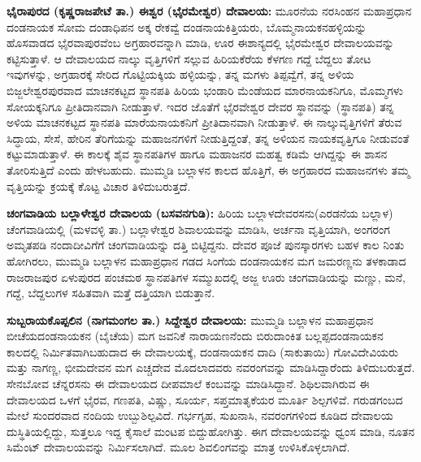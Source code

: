 \textbf{ಭೈರಾಪುರದ (ಕೃಷ್ಣರಾಜಪೇಟೆ ತಾ.) ಈಶ್ವರ (ಭೈರಮೇಶ್ವರ) ದೇವಾಲಯ:} ಮೂರನೆಯ ನರಸಿಂಹನ ಮಹಾಪ್ರಧಾನ ದಂಡನಾಯಕ ಸೋಮ ದಂಡಾಧಿಪನ ಅಕ್ಕ ರೇಕವ್ವೆ ದಂಡನಾಯಕಿತ್ತಿಯರು, ಬೊಮ್ಮನಾಯಕನಹಳ್ಳಿಯನ್ನು ಹೊಸವಾಡದ ಭೈರವಾಪುರವೆಂಬ ಅಗ್ರಹಾರವನ್ನಾಗಿ ಮಾಡಿ, ಊರ ಈಶಾನ್ಯದಲ್ಲಿ ಭೈರಮೇಶ್ವರ ದೇವಾಲಯವನ್ನು ಕಟ್ಟಿಸುತ್ತಾಳೆ. ಆ ದೇವಾಲಯದ ನಾಲ್ಕು ವೃತ್ತಿಗಳಿಗೆ ಸಲ್ಲುವ ಹಿರಿಯಕೆರೆಯ ಕೆಳಗಣ ಗದ್ದೆ ಬೆದ್ದಲು ತೋಟ ಇವುಗಳನ್ನು, ಅಗ್ರಹಾರಕ್ಕೆ ಸೇರಿದ ಗೊಟ್ಟಿಯಕ್ಕಿಯ ಹಳ್ಳಿಯನ್ನು, ತನ್ನ ಮಗಳು ತಿಪ್ಪವ್ವೆಗೆ, ತನ್ನ ಅಳಿಯ ಬಿಜ್ಜಲೇಶ್ವರಪುರವಾದ ಮಾಚನಕಟ್ಟದ ಸ್ಥಾನಪತಿ ಹಿರಿಯ ಭಂಡಾರಿ ಮೆಂಡೆಯದ ಮಾರನಾಯಕನಿಗೂ, ಮೊಮ್ಮಗಳು ಸೋಯಕ್ಕನಿಗೂ ಪ್ರೀತಿದಾನವಾಗಿ ನೀಡುತ್ತಾಳೆ. ಇದರ ಜೊತೆಗೆ ಭೈರವೇಶ್ವರ ದೇವರ ಸ್ಥಾನವನ್ನು (ಸ್ಥಾನಪತಿ) ತನ್ನ ಅಳಿಯ ಮಾಚನಕಟ್ಟದ ಸ್ಥಾನಪತಿ ಮಾರೆಯನಾಯಕನಿಗೆ ಪ್ರೀತಿದಾನವಾಗಿ ನೀಡುತ್ತಾಳೆ. ಈ ನಾಲ್ಕುವೃತ್ತಿಗಳಿಗೆ ತೆರುವ ಸಿದ್ಧಾಯ, ಸೇಸೆ, ಹೇರಿನ ತೆರಿಗೆಯನ್ನು ಮಹಾಜನಗಳಿಗೆ ನೀಡುತ್ತಿದ್ದಂತೆ, ತನ್ನ ಅಳಿಯನ ನಾಯಕವೃತ್ತಿಗೂ ನೀಡುವಂತೆ ಕಟ್ಟುಮಾಡುತ್ತಾಳೆ. ಈ ಕಾಲಕ್ಕೆ ಶೈವ ಸ್ಥಾನಪತಿಗಳ ಹಾಗೂ ಮಹಾಜನರ ಮಹತ್ವ ಕಡಿಮೆ ಆಗಿದ್ದನ್ನು ಈ ಶಾಸನ ತೋರಿಸುತ್ತಿದೆ ಎಂದು ಹೇಳಬಹುದು. ಮುಮ್ಮಡಿ ಬಲ್ಲಾಳನ ಕಾಲದ ಹೊತ್ತಿಗೆ, ಈ ಅಗ್ರಹಾರದ ಮಹಾಜನಗಳು ತಮ್ಮ ವೃತ್ತಿಯನ್ನು ಕ್ರಯಕ್ಕೆ ಕೊಟ್ಟ ವಿಚಾರ ತಿಳಿದುಬರುತ್ತದೆ.

\textbf{ಚಂಗವಾಡಿಯ ಬಲ್ಲಾಳೇಶ್ವರ ದೇವಾಲಯ (ಬಸವನಗುಡಿ):} ಹಿರಿಯ ಬಲ್ಲಾಳದೇವರಸನು(ಎರಡನೆಯ ಬಲ್ಲಾಳ) ಚೆಂಗವಾಡಿಯಲ್ಲಿ (ಮಳವಳ್ಳಿ ತಾ.) ಬಲ್ಲಾಳೇಶ್ವರ ಶಿವಾಲಯವನ್ನು ಮಾಡಿಸಿ, ಅರ್ಚನಾ ವೃತ್ತಿಯಾಗಿ, ಅಂಗರಂಗ ಅಮೃತಪಡಿ ನಂದಾದೀವಿಗೆಗೆ ಚಂಗವಾಡಿಯನ್ನು ದತ್ತಿ ಬಿಟ್ಟಿದ್ದನು. ದೇವರ ಪೂಜೆ ಪುನಸ್ಕಾರಗಳು ಬಹಳ ಕಾಲ ನಿಂತು ಹೋಗಿರಲು, ಮುಮ್ಮಡಿ ಬಲ್ಲಾಳನ ಮಹಾಪ್ರಧಾನ ಗಡದ ಸಿಂಗೆಯ ದಂಡನಾಯಕನ ಮಗ ಜಮರಣ್ಣನು ತಳಕಾಡಾದ ರಾಜರಾಜಪುರ ಏಳುಪುರದ ಪಂಚಮಠ ಸ್ಥಾನಪತಿಗಳ ಸಮ್ಮುಖದಲ್ಲಿ ಅಜ್ಜ ಊರು ಚಂಗವಾಡಿಯನ್ನು ಮಣ್ಣು, ಮನೆ, ಗದ್ದೆ, ಬೆದ್ದಲುಗಳ ಸಹಿತವಾಗಿ ಮತ್ತೆ ದತ್ತಿಯಾಗಿ ಬಿಡುತ್ತಾನೆ.

\textbf{ಸುಬ್ಬರಾಯಕೊಪ್ಪಲಿನ (ನಾಗಮಂಗಲ ತಾ.) ಸಿದ್ದೇಶ್ವರ ದೇವಾಲಯ: }ಮುಮ್ಮಡಿ ಬಲ್ಲಾಳನ ಮಹಾಪ್ರಧಾನ ಬೀಚೆಯದಂಡನಾಯಕನ (ಬೈಚೆಯ) ಮಗ ಜವನಿಕೆ ನಾರಾಯಣನೆಂದು ಬಿರುದಾಂಕಿತ ಬಲ್ಲಪ್ಪದಂಡನಾಯಕನ ಕಾಲದಲ್ಲಿ ನಿರ್ಮಿತವಾಗಿಬಹುದಾದ ಈ ದೇವಾಲಯಕ್ಕೆ, ದಂಡನಾಯಕನ ದಾದಿ (ಸಾಕುತಾಯಿ) ಗೋವಿದೇವಿಯರು ಮತ್ತು ನಾಗಣ್ಣ, ಭೀಮದೇವನ ಮಗ ಎಚ್ಚದೇವ ಮೊದಲಾದವರು ನವರಂಗವನ್ನು ಮಾಡಿಸಿದ್ದಾರೆಂದು ತಿಳಿದುಬರುತ್ತದೆ. ಸೇನಬೋವ ಚೆನ್ನರಸನು ಈ ದೇವಾಲಯದ ದೀಪಮಾಲೆ ಕಂಬವನ್ನು ಮಾಡಿಸಿದ್ದಾನೆ. ಶಿಥಿಲವಾಗಿರುವ ಈ ದೇವಾಲಯದ ಒಳಗೆ ಭೈರವ, ಗಣಪತಿ, ವಿಷ್ಣು, ಸೂರ್ಯ, ಸಪ್ತಮಾತೃಕೆಯರ ಮೂರ್ತಿ ಶಿಲ್ಪಗಳಿವೆ. ಗರುಡಗಂಬದ ಮೇಲೆ ಸುಂದರವಾದ ನಂದಿಯ ಉಬ್ಬುಶಿಲ್ಪವಿದೆ. ಗರ್ಭಗೃಹ, ಸುಖನಾಸಿ, ನವರಂಗಗಳಿಂದ ಕೂಡಿದ ದೇವಾಲಯ ದುಸ್ಥಿತಿಯಲ್ಲಿದ್ದು, ಸುತ್ತಲೂ ಇದ್ದ ಕೈಸಾಲೆ ಮಂಟಪ ಬಿದ್ದುಹೋಗಿತ್ತು. ಈಗ ದೇವಾಲಯವನ್ನು ಧ್ವಂಸ ಮಾಡಿ, ನೂತನ ಸಿಮೆಂಟ್​ ದೇವಾಲಯವನ್ನು ನಿರ್ಮಿಸಲಾಗಿದೆ. ಮೂಲ ಶಿವಲಿಂಗವನ್ನು ಮಾತ್ರ ಉಳಿಸಿಕೊಳ್ಳಲಾಗಿದೆ.

